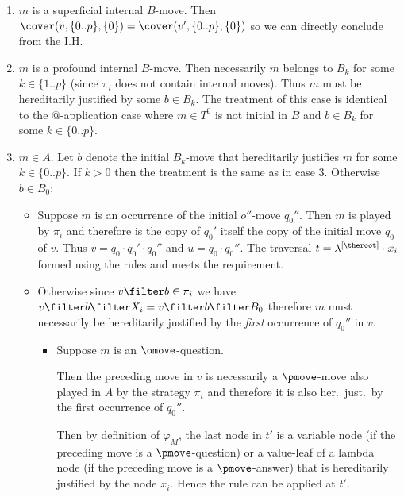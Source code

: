 \begin{itemize}[$\bullet$]
\begin{description}
\begin{enumerate}[1.]
            \item $m$ is a superficial internal $B$-move. Then $\cover(v,\{0..p\}, \{0\}) = \cover(v', \{0..p\}, \{0\})$ so we can directly conclude from the I.H.

            \item $m$ is a profound internal $B$-move. Then necessarily $m$ belongs to $B_k$ for some $k\in \{1..p\}$ (since $\pi_i$ does not contain internal moves). Thus $m$ must be hereditarily justified by some $b \in B_k$. The treatment of this case is identical to the @-application case where $m\in T^0$ is not initial in $B$ and $b \in B_k$ for some $k\in \{0..p\}$.

            \item $m \in A$. Let $b$ denote the initial $B_k$-move that hereditarily justifies $m$ for some $k \in\{0..p\}$.
                  If $k>0$ then the treatment is the same as in case 3. Otherwise $b \in B_0$:

                   \begin{itemize}
                     \item Suppose $m$ is an occurrence of the initial $o''$-move $q_0''$. Then $m$ is played by $\pi_i$ and therefore is the copy of $q_0'$ itself the copy of the initial move $q_0$ of $v$. Thus $v = q_0 \cdot q_0' \cdot q_0''$ and $u = q_0 \cdot q_0''$. The traversal $t = \lambda^{[\theroot]} \cdot x_i$ formed using the rules  and  meets the requirement.

                   \item Otherwise since $v \filter b \in \pi_i$ we have $ v \filter b \filter X_i = v \filter b \filter B_0$ therefore $m$ must necessarily be hereditarily justified by the \emph{first} occurrence of $q_0''$ in $v$.

                       \begin{itemize}
                         \item Suppose $m$ is an $\omove$-question.

                       Then the preceding move in $v$ is necessarily a $\pmove$-move also played in $A$ by the strategy $\pi_i$ and therefore it is also her.\ just.\ by the first occurrence of $q_0''$.

                       Then by definition of $\varphi_M$, the last node in  $t'$ is a variable node (if the preceding move is a $\pmove$-question) or a value-leaf of a lambda node (if the preceding move is a $\pmove$-answer) that is hereditarily justified by the node $x_i$. Hence the  rule  can be applied at $t'$.


\end{itemize}
\end{itemize}
\end{enumerate}
\end{description}
\end{itemize}
